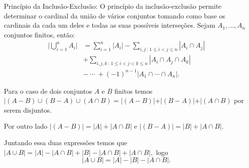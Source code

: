 \begin{frame}{Princípio da Inclusão-Exclusão:} O princípio da inclusão-exclusão permite determinar o cardinal da união de vários conjuntos tomando como base os cardinais da cada um deles e todas as suas possíveis interseções. 
Sejam  $A_1,\ldots, A_n$  conjuntos finitos,  então:
$$
\begin{aligned} 
\biggl|\bigcup_{i=1}^n A_i\biggr| & =\sum_{i=1}^n\left|A_i\right| - \sum_{i,j\,:\,1 \le i < j \le n}\left|A_i\cap A_j\right| \\ &+\sum_{i,j,k\,:\,1 \le i < j < k \le n}\left|A_i\cap A_j\cap A_k\right| \\
& -\ \cdots\ + \left(-1\right)^{n-1} \left|A_1\cap\cdots\cap A_n\right|. 
\end{aligned}
$$

Para o caso de dois conjuntos $A$ e $B$ finitos temos $|(A - B) \cup (B - A) \cup (A\cap B) = |(A - B)| + |(B - A)|+|(A\cap B)$  por serem disjuntos. 

Por outro lado $|(A - B)|=|A|+|A \cap B|$ e $|(B - A)|=|B|+|A \cap B|.$ 

Juntando essa duas expressões temos que 
$|A \cup B| = |A|-|A \cap B| + |B|-|A\cap B| + |A\cap B|,$ logo $$|A \cup B| = |A|-|B|-|A\cap B|.$$

\end{frame}

